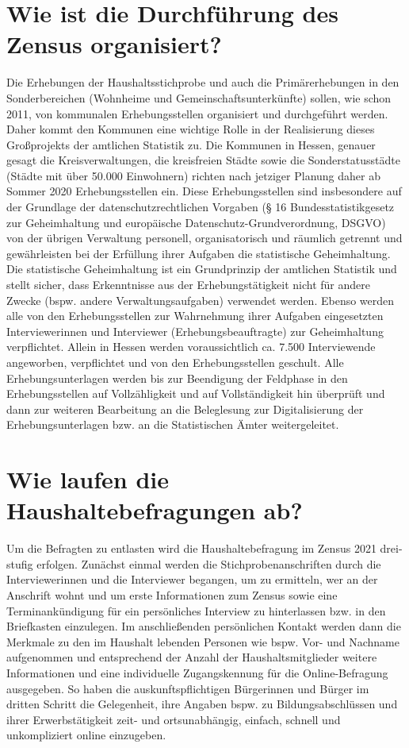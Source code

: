 \section{Wie ist die Durchführung des Zensus organisiert?}
Die Erhebungen der Haushaltsstichprobe und auch die Primärerhebungen in den Sonderbereichen (Wohnheime und Gemeinschaftsunterkünfte) sollen, wie schon 2011, von kommunalen Erhebungsstellen organisiert und durchgeführt werden. Daher kommt den Kommunen eine wichtige Rolle in der Realisierung dieses Großprojekts der amtlichen Statistik zu. Die Kommunen in Hessen, genauer gesagt die Kreisverwaltungen, die kreisfreien Städte sowie die Sonderstatusstädte (Städte mit über 50.000 Einwohnern) richten nach jetziger Planung daher ab Sommer 2020 Erhebungsstellen ein. Diese Erhebungsstellen sind insbesondere auf der Grundlage der datenschutzrechtlichen Vorgaben (§ 16 Bundesstatistikgesetz zur Geheimhaltung und europäische Datenschutz-Grundverordnung, DSGVO) von der übrigen Verwaltung personell, organisatorisch und räumlich getrennt und gewährleisten bei der Erfüllung ihrer Aufgaben die statistische Geheimhaltung. Die statistische Geheimhaltung ist ein Grundprinzip der amtlichen Statistik und stellt sicher, dass Erkenntnisse aus der Erhebungstätigkeit nicht für andere Zwecke (bspw. andere Verwaltungsaufgaben) verwendet werden. Ebenso werden alle von den Erhebungsstellen zur Wahrnehmung ihrer Aufgaben eingesetzten Interviewerinnen und Interviewer (Erhebungsbeauftragte) zur Geheimhaltung verpflichtet. Allein in Hessen werden voraussichtlich ca. 7.500 Interviewende angeworben, verpflichtet und von den Erhebungsstellen geschult. Alle Erhebungsunterlagen werden bis zur Beendigung der Feldphase in den Erhebungsstellen auf Vollzähligkeit und auf Vollständigkeit hin überprüft und dann zur weiteren Bearbeitung an die Beleglesung zur Digitalisierung der Erhebungsunterlagen bzw. an die Statistischen Ämter weitergeleitet.

\section{Wie laufen die Haushaltebefragungen ab?}
Um die Befragten zu entlasten wird die Haushaltebefragung im Zensus 2021 drei-stufig erfolgen. Zunächst einmal werden die Stichprobenanschriften durch die Interviewerinnen und die Interviewer begangen, um zu ermitteln, wer an der Anschrift wohnt und um erste Informationen zum Zensus sowie eine Terminankündigung für ein persönliches Interview zu hinterlassen bzw. in den Briefkasten einzulegen. Im anschließenden persönlichen Kontakt werden dann die Merkmale zu den im Haushalt lebenden Personen wie bspw. Vor- und Nachname aufgenommen und entsprechend der Anzahl der Haushaltsmitglieder weitere Informationen und eine individuelle Zugangskennung für die Online-Befragung ausgegeben. So haben die auskunftspflichtigen Bürgerinnen und Bürger im dritten Schritt die Gelegenheit, ihre Angaben bspw. zu Bildungsabschlüssen und ihrer Erwerbstätigkeit zeit- und ortsunabhängig, einfach, schnell und unkompliziert online einzugeben.

